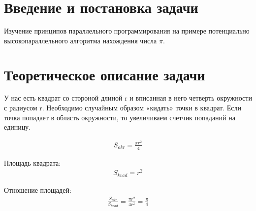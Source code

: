 \documentclass[a4paper,14pt]{extarticle}
\begin{document}
\section{Введение и постановка задачи}
Изучение принципов параллельного программирования на примере потенциально высокопараллельного алгоритма нахождения числа $\pi$.

\section{Теоретическое описание задачи}
У нас есть квадрат со стороной длиной r и вписанная в него четверть окружности с радиусом r. Необходимо случайным образом «кидать» точки в квадрат. Если точка попадает в область окружности, то увеличиваем счетчик попаданий на единицу.

\begin{align*}
S_{okr} = \frac{\pi r^2}{4}
\end{align*}

Площадь квадрата:
\begin{align*}
S_{kvad} = r^2
\end{align*}

Отношение площадей:
\begin{align*}
\frac{S_{okr}}{S_{kvad}} = \frac{\pi r^2}{4r^2} = \frac{\pi}{4}
\end{align*}

\newpage
\end{document}
